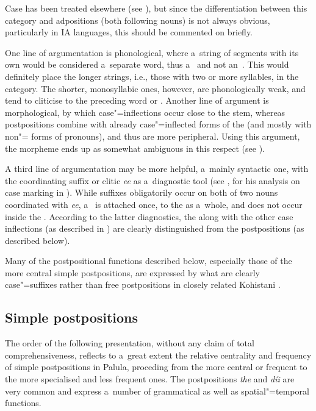 Case  has been treated elsewhere (see ), but since the differentiation between this category and adpositions (both following nouns) is not always obvious, particularly in IA languages, this should be commented on briefly. 


One line of argumentation is phonological, where a~string of segments with its own  would be considered a~separate word, thus a~ and not an~. This would definitely place the longer strings, i.e., those with two or more syllables, in the  category. The shorter, monosyllabic ones, however, are phonologically weak, and tend to cliticise to the preceding  word or . Another line of argument is morphological, by which case"=inflections occur close to the stem, whereas postpositions combine with already case"=inflected forms of the  (and mostly with non"= forms of pronouns), and thus are more peripheral. Using this argument, the  morpheme ends up as somewhat ambiguous in this respect (see ).


A third line of argumentation may be more helpful, a~mainly syntactic one, with the coordinating suffix or clitic \textit{ee} as a~diagnostic tool (see \citealt[77]{baart1999a}, for his analysis on case marking in \iliGawri). While  suffixes obligatorily occur on both of two nouns coordinated with \textit{ee}, a~ is attached once, to the  as a~whole, and does not occur inside the . According to the latter diagnostics, the  along with the other case inflections (as described in ) are clearly distinguished from the postpositions (as described below). 

\largerpage[-1]
Many of the postpositional functions described below, especially those of the more central simple postpositions, are expressed by what are clearly  case"=suffixes rather than free postpositions  in closely related Kohistani \iliShina \citep[115--130]{schmidtkohistani2001}. 


\subsection{Simple postpositions}
\label{subsec:7-2-2}

The order of the following presentation, without any claim of total comprehensiveness, reflects to a~great extent the relative centrality and frequency of simple postpositions in Palula, proceding from the more central or frequent to the more specialised and less frequent ones. The postpositions \textit{the} and \textit{díi} are very common and express a~number of grammatical as well as spatial"=temporal functions. 


